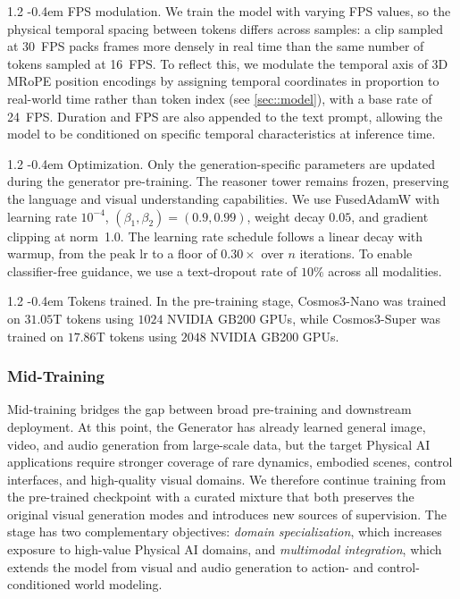 \documentclass{llmxive}
\makeatletter
\providecommand{\paragraph}{  \@startsection{paragraph}{4}{\z@}    {1\baselineskip \@plus .2\baselineskip}    {-0.4em}    {\normalfont\normalsize\bfseries}}
\makeatother
\begin{document}
\paragraph{FPS modulation.}
We train the model with varying FPS values, so the physical temporal spacing between tokens differs across samples: a clip sampled at 30~FPS packs frames more densely in real time than the same number of tokens sampled at 16~FPS. To reflect this, we modulate the temporal axis of 3D MRoPE position encodings by assigning temporal coordinates in proportion to real-world time rather than token index (see \cref{sec::model}), with a base rate of 24~FPS. Duration and FPS are also appended to the text prompt, allowing the model to be conditioned on specific temporal characteristics at inference time.

\paragraph{Optimization.}
Only the generation-specific parameters are updated during the generator pre-training. The reasoner tower remains frozen, preserving the language and visual understanding capabilities. We use FusedAdamW with learning rate $10^{-4}$, $(\beta_1, \beta_2) = (0.9, 0.99)$, weight decay $0.05$, and gradient clipping at norm~1.0. The learning rate schedule follows a linear decay with warmup, from the peak lr to a floor of $0.30\times$ over $n$ iterations. To enable classifier-free guidance, we use a text-dropout rate of $10\%$ across all modalities.

\paragraph{Tokens trained.} In the pre-training stage, Cosmos3-Nano was trained on $31.05$T tokens using $1024$ NVIDIA GB200 GPUs, while Cosmos3-Super was trained on $17.86$T tokens using $2048$ NVIDIA GB200 GPUs.

\subsubsection{Mid-Training}

Mid-training bridges the gap between broad pre-training and downstream deployment. At this point, the Generator has already learned general image, video, and audio generation from large-scale data, but the target Physical AI applications require stronger coverage of rare dynamics, embodied scenes, control interfaces, and high-quality visual domains. We therefore continue training from the pre-trained checkpoint with a curated mixture that both preserves the original visual generation modes and introduces new sources of supervision. The stage has two complementary objectives: \textit{domain specialization}, which increases exposure to high-value Physical AI domains, and \textit{multimodal integration}, which extends the model from visual and audio generation to action- and control-conditioned world modeling.
\end{document}
